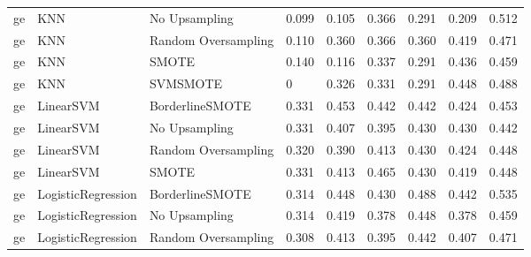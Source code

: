\begin{tabular}{lllllllll}
      ge &                          KNN &       No Upsampling &     0.099 &                     0.105 &                 0.366 &                  0.291 &                                   0.209 &     0.512 \\
      ge &                          KNN & Random Oversampling &     0.110 &                     0.360 &                 0.366 &                  0.360 &                                   0.419 &     0.471 \\
      ge &                          KNN &               SMOTE &     0.140 &                     0.116 &                 0.337 &                  0.291 &                                   0.436 &     0.459 \\
      ge &                          KNN &            SVMSMOTE &         0 &                     0.326 &                 0.331 &                  0.291 &                                   0.448 &     0.488 \\
      ge &                    LinearSVM &     BorderlineSMOTE &     0.331 &                     0.453 &                 0.442 &                  0.442 &                                   0.424 &     0.453 \\
      ge &                    LinearSVM &       No Upsampling &     0.331 &                     0.407 &                 0.395 &                  0.430 &                                   0.430 &     0.442 \\
      ge &                    LinearSVM & Random Oversampling &     0.320 &                     0.390 &                 0.413 &                  0.430 &                                   0.424 &     0.448 \\
      ge &                    LinearSVM &               SMOTE &     0.331 &                     0.413 &                 0.465 &                  0.430 &                                   0.419 &     0.448 \\
      ge &           LogisticRegression &     BorderlineSMOTE &     0.314 &                     0.448 &                 0.430 &                  0.488 &                                   0.442 &     0.535 \\
      ge &           LogisticRegression &       No Upsampling &     0.314 &                     0.419 &                 0.378 &                  0.448 &                                   0.378 &     0.459 \\
      ge &           LogisticRegression & Random Oversampling &     0.308 &                     0.413 &                 0.395 &                  0.442 &                                   0.407 &     0.471 \\

\end{tabular}
